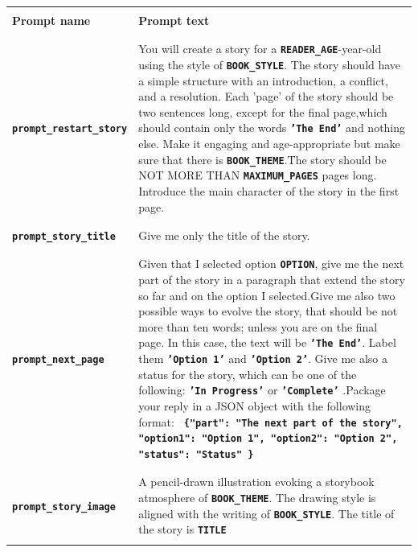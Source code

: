 \documentclass[conference]{IEEEtran}
\begin{document}
	\begin{table}[H]
	\centering
	\begin{tabular}{|l|p{8cm}|}
		\hline
		& \\
		\textbf{Prompt name} & \textbf{Prompt text} \\
		& \\ \hline
				
		& \\
		\textbf{\texttt{prompt\_restart\_story}} & You will create a story for a \textbf{\texttt{READER\_AGE}}-year-old using the style of \textbf{\texttt{BOOK\_STYLE}}. The story should have a simple structure with an introduction, a conflict, and a resolution. Each 'page' of the story should be two sentences long, except for the final page,which should contain only the words \textbf{\texttt{'The End'}} and nothing else. Make it engaging and age-appropriate but make sure that there is \textbf{\texttt{BOOK\_THEME}}.The story should be NOT MORE THAN \textbf{\texttt{MAXIMUM\_PAGES}} pages long. Introduce the main character of the story in the first page. \\ 
		& \\ \hline
		
		& \\
		\textbf{\texttt{prompt\_story\_title}} & Give me only the title of the story. \\
		& \\ \hline
		
		& \\
		\textbf{\texttt{prompt\_next\_page}} & Given that I selected option \textbf{\texttt{OPTION}}, give me the next part of the story in a paragraph that extend the story so far and on the option I selected.Give me also two possible ways to evolve the story, that should be not more than ten words; unless you are on the final page. In this case, the text will be \textbf{\texttt{'The End'}}. Label them \textbf{\texttt{'Option 1'}} and \textbf{\texttt{'Option 2'}}. Give me also a status for the story, which can be one of the following: \textbf{\texttt{'In Progress'}} or \textbf{\texttt{'Complete'}} .Package your reply in a JSON object with the following format: \textbf{\texttt{ \{"part": "The next part of the story", "option1": "Option 1", "option2": "Option 2", "status": "Status" \} }} \\
		& \\ \hline
				
		& \\
		\textbf{\texttt{prompt\_story\_image}} & A pencil-drawn illustration evoking a storybook atmosphere of \textbf{\texttt{BOOK\_THEME}}. The drawing style is aligned with the writing of \textbf{\texttt{BOOK\_STYLE}}. The title of the story is \textbf{\texttt{TITLE}} \\
		& \\ \hline
		
	\end{tabular}
\end{table}

	
\end{document}
